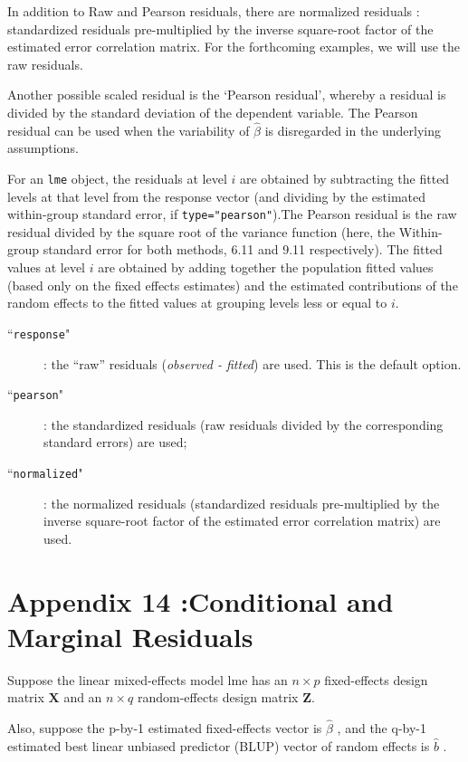 \documentclass[12pt, a4paper]{report}
\theoremstyle{plain}
\theoremstyle{definition}
\theoremstyle{remark}
\begin{document}
	In addition to Raw and Pearson residuals, there are normalized residuals : standardized residuals pre-multiplied by the inverse square-root factor of the estimated error correlation matrix. For the forthcoming examples, we will use the raw residuals.

	
	Another possible scaled residual is the  `Pearson residual', whereby a residual is divided by the standard deviation of the dependent variable. The Pearson residual can be used when the variability of $\hat{\beta}$ is disregarded in the underlying assumptions.
	
	For an \texttt{lme} object, the residuals at level $i$ are obtained by subtracting the fitted levels at that level from the response vector (and dividing by the estimated within-group standard error, if \texttt{type="pearson"}).The Pearson residual is the raw residual divided by the square root of the variance function (here, the Within-group standard error for both methods, 6.11 and 9.11 respectively). The fitted values at level $i$ are obtained by adding together the population fitted values (based only on the fixed effects estimates) and the estimated contributions of the random effects to the fitted values at grouping levels less or equal to $i$.
	
	\begin{description}
		\item[``\texttt{response}"]: the “raw” residuals (\textit{observed - fitted}) are used. This is the default option.
		\item[``\texttt{pearson}"]: the standardized residuals (raw residuals divided by the corresponding standard errors) are used; 
		\item[``\texttt{normalized}"]: the normalized residuals (standardized residuals pre-multiplied by the inverse square-root factor of the estimated error correlation matrix) are used.
	\end{description}


	\section*{Appendix 14 :Conditional and Marginal Residuals}
	
	Suppose the linear mixed-effects model lme has an $n \times p$ fixed-effects design matrix $\boldsymbol{X}$ and an $n \times q$ random-effects design matrix $\boldsymbol{Z}$. 
	
	Also, suppose the p-by-1 estimated fixed-effects vector is $\hat{\beta}$ , and the q-by-1 estimated best linear unbiased predictor (BLUP) 
	vector of random effects is $\hat{b}$ . 
	
\end{document}
